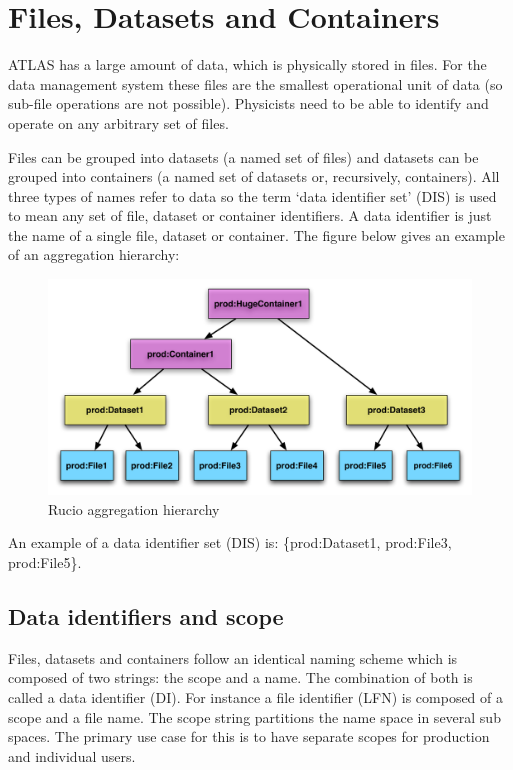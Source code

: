 \documentclass{atlasnote}
\begin{document}
\section{Files, Datasets and Containers}
\label{overview_Dataset:dataset}

ATLAS has a large amount of data, which is physically stored in files. For the data management system these files are the smallest operational unit of data (so sub-file operations are not possible). Physicists need to be able to identify and operate on any arbitrary set of files.

Files can be grouped into datasets (a named set of files) and datasets can be grouped into containers (a named set of datasets or, recursively, containers). All three types of names refer to data so the term ‘data identifier set’ (DIS) is used to mean any set of file, dataset or container identifiers. A data identifier is just the name of a single file, dataset or container. The figure below gives an example of an aggregation hierarchy:

\begin{figure}[h]
\begin{center}
\includegraphics[width=400pt]{aggregation_hierarchy.pdf}
\end{center}
\caption{\label{hierarchy} Rucio aggregation hierarchy}
\end{figure}

\noindent An example of a data identifier set (DIS) is: \{prod:Dataset1, prod:File3, prod:File5\}.

\subsection{Data identifiers and scope}
\label{overview_Dataset:data-identifiers-and-scope}

Files, datasets and containers follow an identical naming scheme which is composed of two strings: the scope and a name. The combination of both is called a data identifier (DI). For instance a file identifier (LFN) is composed of a scope and a file name. The scope string partitions the name space in several sub spaces. The primary use case for this is to have separate scopes for production and individual users.
\end{document}
